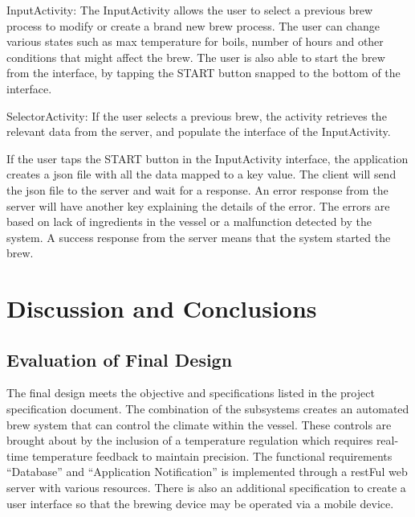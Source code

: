 \documentclass{article}
\begin{document}
\noindent InputActivity: The InputActivity allows the user to select a previous brew process to modify or create a brand new brew process. The user can change various states such as max temperature for boils, number of hours and other conditions that might affect the brew. The user is also able to start the brew from the interface, by tapping the START button snapped to the bottom of the interface.

\noindent SelectorActivity: If the user selects a previous brew, the activity retrieves the relevant data from the server, and populate the interface of the InputActivity.

\noindent If the user taps the START button in the InputActivity interface, the application creates a \gls{json} file with all the data mapped to a key value. The client will send the \gls{json} file to the server and wait for a response. An error response from the server will have another key explaining the details of the error. The errors are based on lack of ingredients in the vessel or a malfunction detected by the system. A success response from the server means that the system started the brew.

\section{Discussion and Conclusions}
\subsection{Evaluation of Final Design}
The final design meets the objective and specifications listed in the project specification document. The combination of the subsystems creates an automated brew system that can control the climate within the vessel.  These controls are brought about by the inclusion of a temperature regulation which requires real-time temperature feedback to maintain precision. The functional requirements ``Database'' and ``Application Notification'' is implemented through a \gls{rest}Ful web server with various resources. There is also an additional specification to create a user interface so that the brewing device may be operated via a mobile device.
\end{document}
